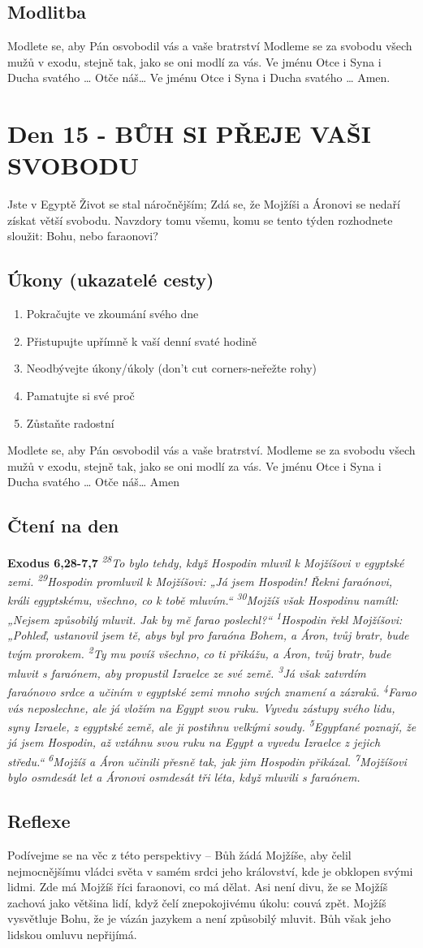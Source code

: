 \documentclass[11pt]{article}
\newcommand{\zacatekTretiTyden}{
  Jste v Egyptě \newline
  Život se stal náročnějším; Zdá se, že Mojžíši a Áronovi se nedaří získat větší svobodu. Navzdory tomu všemu,
komu se tento týden rozhodnete sloužit: Bohu, nebo faraonovi?

\subsection*{Úkony (ukazatelé cesty)}
\begin{enumerate}
  \item Pokračujte ve zkoumání svého dne
  \item Přistupujte upřímně k vaší denní svaté hodině
  \item Neodbývejte úkony/úkoly (don’t cut corners-neřežte rohy)
  \item Pamatujte si své proč
  \item Zůstaňte radostní
\end{enumerate}
Modlete se, aby Pán osvobodil vás a vaše bratrství. \newline
Modleme se za svobodu všech mužů v exodu, stejně tak, jako se oni modlí za vás.\newline
Ve jménu Otce i Syna i Ducha svatého …  Otče náš… Amen
}
\begin{document}
\subsection*{Modlitba}
Modlete se, aby Pán osvobodil vás a vaše bratrství \newline
Modleme se za svobodu všech mužů v exodu, stejně tak, jako se oni modlí za vás.\newline
Ve jménu Otce i Syna i Ducha svatého … Otče náš… Ve jménu Otce i Syna i Ducha svatého … Amen.

\newpage


\newpage
\section{Den 15 - BŮH SI PŘEJE VAŠI SVOBODU}
\zacatekTretiTyden
\subsection*{Čtení na den}
\textbf{Exodus 6,28-7,7}
\newline
\textit{
\textsuperscript{28}To bylo tehdy, když Hospodin mluvil k Mojžíšovi v egyptské zemi.
\textsuperscript{29}Hospodin promluvil k Mojžíšovi: „Já jsem Hospodin! Řekni faraónovi, králi egyptskému, všechno, co k tobě mluvím.“
\textsuperscript{30}Mojžíš však Hospodinu namítl: „Nejsem způsobilý mluvit. Jak by mě farao poslechl?“
\textsuperscript{1}Hospodin řekl Mojžíšovi: „Pohleď, ustanovil jsem tě, abys byl pro faraóna Bohem, a Áron, tvůj bratr, bude tvým prorokem.
\textsuperscript{2}Ty mu povíš všechno, co ti přikážu, a Áron, tvůj bratr, bude mluvit s faraónem, aby propustil Izraelce ze své země.
\textsuperscript{3}Já však zatvrdím faraónovo srdce a učiním v egyptské zemi mnoho svých znamení a zázraků.
\textsuperscript{4}Farao vás neposlechne, ale já vložím na Egypt svou ruku. Vyvedu zástupy svého lidu, syny Izraele, z egyptské země, ale ji postihnu velkými soudy.
\textsuperscript{5}Egypťané poznají, že já jsem Hospodin, až vztáhnu svou ruku na Egypt a vyvedu Izraelce z jejich středu.“
\textsuperscript{6}Mojžíš a Áron učinili přesně tak, jak jim Hospodin přikázal.
\textsuperscript{7}Mojžíšovi bylo osmdesát let a Áronovi osmdesát tři léta, když mluvili s faraónem.
}

\subsection*{Reflexe}
Podívejme se na věc z této perspektivy – Bůh žádá Mojžíše, aby čelil nejmocnějšímu vládci světa v samém srdci
jeho království, kde je obklopen svými lidmi. Zde má Mojžíš říci faraonovi, co má dělat. Asi není divu, že se
Mojžíš zachová jako většina lidí, když čelí znepokojivému úkolu: couvá zpět. Mojžíš vysvětluje Bohu, že je vázán
jazykem a není způsobilý mluvit. Bůh však jeho lidskou omluvu nepřijímá.
\end{document}
